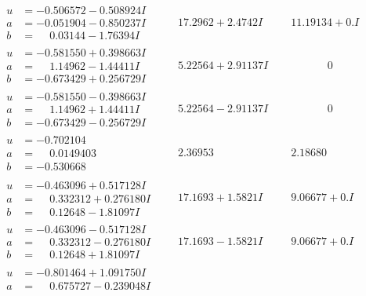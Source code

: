 \documentclass[1p]{elsarticle_modified}
\theoremstyle{definition}
\begin{document}
$$\begin{array}{c|c|c}
\begin{aligned}
u &= -0.506572 - 0.508924 I \\
a &= -0.051904 - 0.850237 I \\
b &= \phantom{-}0.03144 - 1.76394 I\end{aligned}
 & \phantom{-}17.2962 + 2.4742 I & \phantom{-}11.19134 + 0. I\phantom{ +0.000000I} \\ \hline\begin{aligned}
u &= -0.581550 + 0.398663 I \\
a &= \phantom{-}1.14962 - 1.44411 I \\
b &= -0.673429 + 0.256729 I\end{aligned}
 & \phantom{-}5.22564 + 2.91137 I & \phantom{-0.000000 } 0 \\ \hline\begin{aligned}
u &= -0.581550 - 0.398663 I \\
a &= \phantom{-}1.14962 + 1.44411 I \\
b &= -0.673429 - 0.256729 I\end{aligned}
 & \phantom{-}5.22564 - 2.91137 I & \phantom{-0.000000 } 0 \\ \hline\begin{aligned}
u &= -0.702104\phantom{ +0.000000I} \\
a &= \phantom{-}0.0149403\phantom{ +0.000000I} \\
b &= -0.530668\phantom{ +0.000000I}\end{aligned}
 & \phantom{-}2.36953\phantom{ +0.000000I} & \phantom{-}2.18680\phantom{ +0.000000I} \\ \hline\begin{aligned}
u &= -0.463096 + 0.517128 I \\
a &= \phantom{-}0.332312 + 0.276180 I \\
b &= \phantom{-}0.12648 - 1.81097 I\end{aligned}
 & \phantom{-}17.1693 + 1.5821 I & \phantom{-}9.06677 + 0. I\phantom{ +0.000000I} \\ \hline\begin{aligned}
u &= -0.463096 - 0.517128 I \\
a &= \phantom{-}0.332312 - 0.276180 I \\
b &= \phantom{-}0.12648 + 1.81097 I\end{aligned}
 & \phantom{-}17.1693 - 1.5821 I & \phantom{-}9.06677 + 0. I\phantom{ +0.000000I} \\ \hline\begin{aligned}
u &= -0.801464 + 1.091750 I \\
a &= \phantom{-}0.675727 - 0.239048 I \\

\end{aligned}
\end{array}$$
\end{document}
